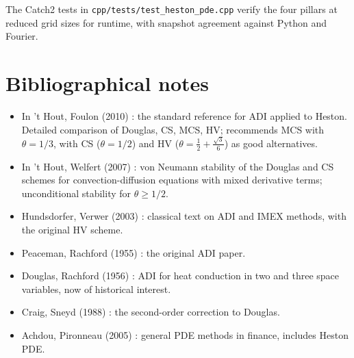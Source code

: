 \documentclass[11pt]{article}
\theoremstyle{plain}
\theoremstyle{definition}
\theoremstyle{remark}
\begin{document}
The Catch2 tests in \texttt{cpp/tests/test\_heston\_pde.cpp} verify the four pillars at reduced grid sizes for runtime, with snapshot agreement against Python and Fourier.

\section{Bibliographical notes}

\begin{itemize}[topsep=2pt]
    \item In 't Hout, Foulon (2010) \cite{InHoutFoulon2010}: the standard reference for ADI applied to Heston. Detailed comparison of Douglas, CS, MCS, HV; recommends MCS with $\theta = 1/3$, with CS ($\theta = 1/2$) and HV ($\theta = \tfrac12 + \tfrac{\sqrt3}{6}$) as good alternatives.
    \item In 't Hout, Welfert (2007) \cite{InHoutWelfert2007}: von Neumann stability of the Douglas and CS schemes for convection-diffusion equations with mixed derivative terms; unconditional stability for $\theta \ge 1/2$.
    \item Hundsdorfer, Verwer (2003) \cite{HundsdorferVerwer2003}: classical text on ADI and IMEX methods, with the original HV scheme.
    \item Peaceman, Rachford (1955) \cite{PeacemanRachford1955}: the original ADI paper.
    \item Douglas, Rachford (1956) \cite{DouglasRachford1956}: ADI for heat conduction in two and three space variables, now of historical interest.
    \item Craig, Sneyd (1988) \cite{CraigSneyd1988}: the second-order correction to Douglas.
    \item Achdou, Pironneau (2005) \cite{AchdouPironneau2005}: general PDE methods in finance, includes Heston PDE.
\end{itemize}
\end{document}
